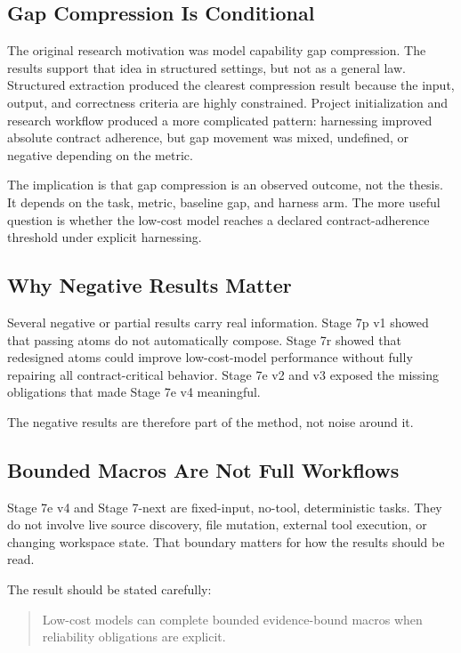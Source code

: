 \documentclass[11pt]{article}
\begin{document}
\subsection{Gap Compression Is Conditional}

The original research motivation was model capability gap compression. The results support that idea in structured settings, but not as a general law. Structured extraction produced the clearest compression result because the input, output, and correctness criteria are highly constrained. Project initialization and research workflow produced a more complicated pattern: harnessing improved absolute contract adherence, but gap movement was mixed, undefined, or negative depending on the metric.

The implication is that gap compression is an observed outcome, not the thesis. It depends on the task, metric, baseline gap, and harness arm. The more useful question is whether the low-cost model reaches a declared contract-adherence threshold under explicit harnessing.

\subsection{Why Negative Results Matter}

Several negative or partial results carry real information. Stage 7p v1 showed that passing atoms do not automatically compose. Stage 7r showed that redesigned atoms could improve low-cost-model performance without fully repairing all contract-critical behavior. Stage 7e v2 and v3 exposed the missing obligations that made Stage 7e v4 meaningful.

The negative results are therefore part of the method, not noise around it.

\subsection{Bounded Macros Are Not Full Workflows}

Stage 7e v4 and Stage 7-next are fixed-input, no-tool, deterministic tasks. They do not involve live source discovery, file mutation, external tool execution, or changing workspace state. That boundary matters for how the results should be read.

The result should be stated carefully:

\begin{quote}
Low-cost models can complete bounded evidence-bound macros when reliability obligations are explicit.
\end{quote}
\end{document}
